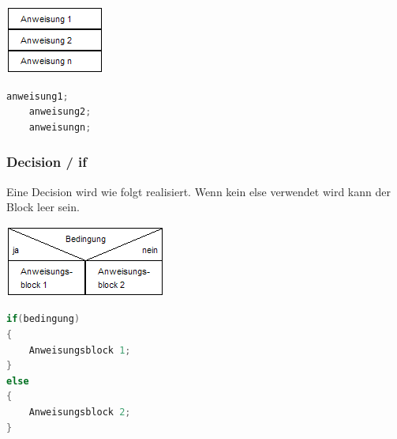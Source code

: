 \noindent
\begin{minipage}{0.2\columnwidth} 
\includegraphics[width=1\columnwidth]{Pictures/Struktogramm_Prozessbloecke.png}
\end{minipage}
\begin{minipage}{0.8\columnwidth} 
\begin{lstlisting}[language = c]
    anweisung1;
    anweisung2;
    anweisungn;
\end{lstlisting}
\end{minipage}

\subsubsection{Decision / if}

Eine Decision wird wie folgt realisiert. Wenn kein else verwendet wird kann der Block leer sein.\newline

\noindent
\begin{minipage}{0.4\columnwidth} 
\includegraphics[width=1\columnwidth]{Pictures/Struktogramm_decision.png}
\end{minipage}
\begin{minipage}{0.6\columnwidth} 
\begin{lstlisting}[language = c]
if(bedingung)
{
    Anweisungsblock 1;
}
else
{
    Anweisungsblock 2;
}
\end{lstlisting}
\end{minipage}

